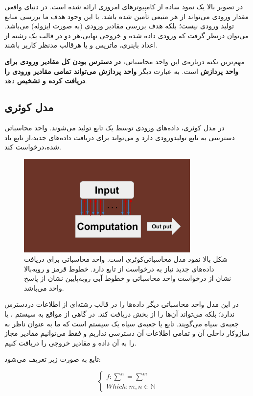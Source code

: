 \documentclass{book}
\begin{document}
در تصویر بالا یک نمود ساده از کامپیوتر‌های امروزی ارائه شده است. در دنیای واقعی مقدار ورودی می‌تواند از هر منبعی‌ تأمین شده باشد. با این وجود هدف ما بررسی منابع تولید ورودی نیست؛‌ بلکه هدف بررسی مقادیر ورودی (به صورت ایزوله) می‌باشد. می‌توان درنظر گرفت که ورودی داده شده و خروجی نهایی،‌هر دو در قالب یک رشته از اعداد باینری، ماتریس و یا هرقالب مدنظر کاربر باشند.

مهم‌ترین نکته درباره‌ی این واحد محاسباتی،‌ \textbf{در دسترس بودن کل مقادیر ورودی برای واحد پردازش} است. به عبارت دیگر\textbf{ واحد پردازش می‌تواند تمامی مقادیر ورودی را دریافت کرده و تشخیص} دهد. 

\subsection{مدل کوئری}
در مدل کوئری، داده‌های ورودی توسط یک تابع تولید می‌شوند. واحد محاسباتی دسترسی به تابع تولیدورودی دارد و می‌تواند برای دریافت داده‌های جدید،‌از تابع یاد شده،‌درخواست کند.

\begin{figure}[ht]
	\centering
	\includegraphics[width=0.8\textwidth]{Query computation model.png}
	\caption{شکل بالا نمود مدل محاسباتی‌کوئری است. واحد محاسباتی برای دریافت داده‌های جدید نیاز به درخواست از تابع  دارد. خطوط قرمز و روبه‌بالا نشان از درخواست واحد محاسباتی و خطوط آبی روبه‌پایین نشان از پاسخ واحد می‌باشد.}
\end{figure}


در این مدل واحد محاسباتی دیگر داده‌ها را در قالب رشته‌ای از اطلاعات دردسترس ندارد؛ بلکه می‌تواند آن‌ها را از بخش  دریافت کند. در گاهی از مواقع به سیستم ،‌ یا جعبه‌ی سیاه می‌گویند. تابع  یا جعبه‌ی سیاه یک سیستم است که ما به عنوان ناظر به سازوکار داخلی آن و  تمامی اطلاعات آن دسترسی نداریم و فقط می‌توانیم مقادیر مجاز را به آن داده و مقادیر خروجی را دریافت کنیم. 

تابع  به صورت زیر تعریف می‌شود:
\begin{center}
$$
\left\{
\begin{array}{ll}
f : \sum^n = \sum^m\\
Which : m, n \in \mathbb{N}
\end{array}
\right.
$$
\end{center}
\end{document}
